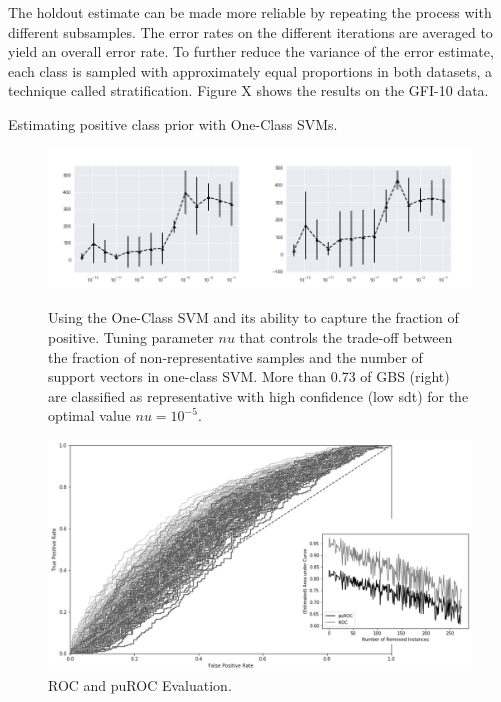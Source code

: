 The holdout estimate can be made more reliable by repeating the process with different subsamples. The error rates on the different iterations are averaged to yield an overall error rate. To further reduce the variance of the error estimate, each class is sampled with approximately equal proportions in both datasets, a technique called stratiﬁcation. Figure X shows the results on the GFI-10 data.

Estimating positive class prior with One-Class SVMs.

\begin{figure}[ht]
	\begin{center}
		\includegraphics[scale=0.50,angle=0]{fig/occfigure}
		\label{occ}
		\caption{Using the One-Class SVM and its ability to capture the fraction of positive. Tuning parameter \(nu\) that controls the trade-off between the fraction of non-representative samples and the number of support vectors in one-class SVM. More than 0.73 of GBS (right) are classified as representative with high confidence (low sdt) for the optimal value \(nu = 10^{-5}\).}
	\end{center}
\end{figure}

\begin{figure}[ht]
\centering
   \includegraphics[scale=0.50,angle=0]{fig/res1}
\caption{ROC and puROC Evaluation.}
   \label{fig:Ng1} 
\end{figure}


